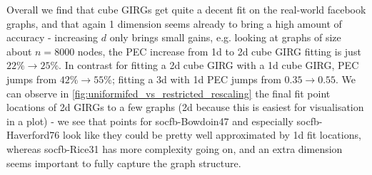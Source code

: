 

Overall we find that cube GIRGs get quite a decent fit on the real-world facebook graphs, and that again 1 dimension seems already to bring a high amount of accuracy - increasing $d$ only brings small gains, e.g. looking at graphs of size about $n=8000$ nodes, the PEC increase from 1d to 2d cube GIRG fitting is just $22\% \to 25\%$. In contrast for fitting a 2d cube GIRG with a 1d cube GIRG, PEC jumps from $42\% \to 55\%$; fitting a 3d with 1d PEC jumps from $0.35 \to 0.55$. We can observe in \cref{fig:uniformifed_vs_restricted_rescaling} the final fit point locations of 2d GIRGs to a few graphs (2d because this is easiest for visualisation in a plot) - we see that points for socfb-Bowdoin47 and especially socfb-Haverford76 look like they could be pretty well approximated by 1d fit locations, whereas socfb-Rice31 has more complexity going on, and an extra dimension seems important to fully capture the graph structure.



